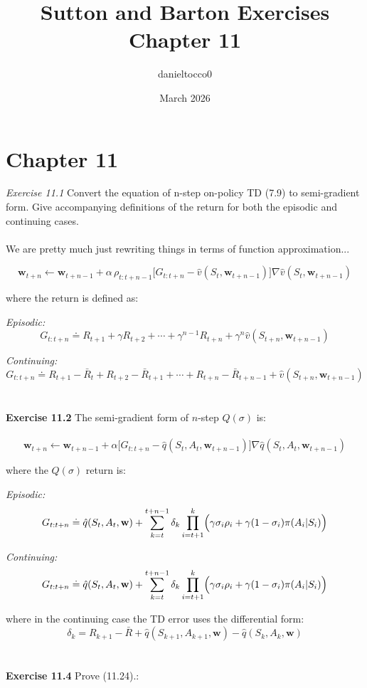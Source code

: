 \documentclass{article}
\title{Sutton and Barton Exercises Chapter 11}
\author{danieltocco0 }
\date{March 2026}
\begin{document}
\maketitle

\section{Chapter 11}

\textit{Exercise 11.1} Convert the equation of n-step on-policy TD (7.9) to semi-gradient form.
Give accompanying definitions of the return for both the episodic and continuing cases.
\\
\\

We are pretty much just rewriting things in terms of function approximation...

\[
\mathbf{w}_{t+n} \leftarrow \mathbf{w}_{t+n-1} + \alpha \, \rho_{t:t+n-1}
\bigl[G_{t:t+n} - \hat{v}(S_t, \mathbf{w}_{t+n-1})\bigr]
\nabla \hat{v}(S_t, \mathbf{w}_{t+n-1})
\]

where the return is defined as:

\textit{Episodic:}
\[
G_{t:t+n} \doteq R_{t+1} + \gamma R_{t+2} + \cdots + \gamma^{n-1} R_{t+n}
+ \gamma^n \hat{v}(S_{t+n}, \mathbf{w}_{t+n-1})
\]

\textit{Continuing:}
\[
G_{t:t+n} \doteq R_{t+1} - \bar{R}_t + R_{t+2} - \bar{R}_{t+1}
+ \cdots + R_{t+n} - \bar{R}_{t+n-1}
+ \hat{v}(S_{t+n}, \mathbf{w}_{t+n-1})
\]
\\\\
\textbf{Exercise 11.2} \quad The semi-gradient form of $n$-step $Q(\sigma)$ is:
\\
\\

\[
\mathbf{w}_{t+n} \leftarrow \mathbf{w}_{t+n-1} + \alpha
\bigl[G_{t:t+n} - \hat{q}(S_t, A_t, \mathbf{w}_{t+n-1})\bigr]
\nabla \hat{q}(S_t, A_t, \mathbf{w}_{t+n-1})
\]

where the $Q(\sigma)$ return is:

\textit{Episodic:}
\[
G_{t:t+n} \doteq \hat{q}(S_t, A_t, \mathbf{w}) + \sum_{k=t}^{t+n-1} \delta_k
\prod_{i=t+1}^{k} \Bigl(\gamma \sigma_i \rho_i + \gamma(1-\sigma_i)\pi(A_i|S_i)\Bigr)
\]

\textit{Continuing:}
\[
G_{t:t+n} \doteq \hat{q}(S_t, A_t, \mathbf{w}) + \sum_{k=t}^{t+n-1} \delta_k
\prod_{i=t+1}^{k} \Bigl(\gamma \sigma_i \rho_i + \gamma(1-\sigma_i)\pi(A_i|S_i)\Bigr)
\]

where in the continuing case the TD error uses the differential form:
\[
\delta_k = R_{k+1} - \bar{R} + \hat{q}(S_{k+1}, A_{k+1}, \mathbf{w})
- \hat{q}(S_k, A_k, \mathbf{w})
\]
\\\\
\textbf{Exercise 11.4} Prove (11.24).:
\\
\\
\end{document}
